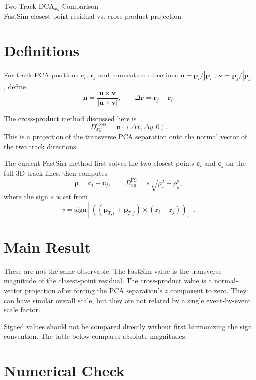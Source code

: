 \documentclass[10pt]{article}
\begin{document}
\begin{center}
{\Large Two-Track DCA$_{xy}$ Comparison}\\[0.25em]
{\small FastSim closest-point residual vs. cross-product projection}
\end{center}

\section*{Definitions}

For track PCA positions $\mathbf{r}_i$, $\mathbf{r}_j$ and momentum directions
$\mathbf{u} = \mathbf{p}_i / |\mathbf{p}_i|$,
$\mathbf{v} = \mathbf{p}_j / |\mathbf{p}_j|$, define
\[
  \mathbf{n} = \frac{\mathbf{u} \times \mathbf{v}}
                    {|\mathbf{u} \times \mathbf{v}|},
  \qquad
  \Delta\mathbf{r} = \mathbf{r}_j - \mathbf{r}_i .
\]

The cross-product method discussed here is
\[
  D^{\mathrm{cross}}_{xy}
    = \mathbf{n}\cdot(\Delta x,\Delta y,0).
\]
This is a projection of the transverse PCA separation onto the normal vector
of the two track directions.

The current FastSim method first solves the two closest points
$\mathbf{c}_i$ and $\mathbf{c}_j$ on the full 3D track lines, then computes
\[
  \boldsymbol{\rho} = \mathbf{c}_i - \mathbf{c}_j,
  \qquad
  D^{\mathrm{FS}}_{xy}
    = s\,\sqrt{\rho_x^2+\rho_y^2},
\]
where the sign $s$ is set from
\[
  s = \mathrm{sign}\left[
    \left((\mathbf{p}_{T,i}+\mathbf{p}_{T,j})
    \times(\mathbf{r}_{i}-\mathbf{r}_{j})\right)_z
  \right].
\]

\section*{Main Result}

These are not the same observable. The FastSim value is the transverse
magnitude of the closest-point residual. The cross-product value is a
normal-vector projection after forcing the PCA separation's $z$ component
to zero. They can have similar overall scale, but they are not related by a
single event-by-event scale factor.

Signed values should not be compared directly without first harmonizing the
sign convention. The table below compares absolute magnitudes.

\section*{Numerical Check}
\end{document}
